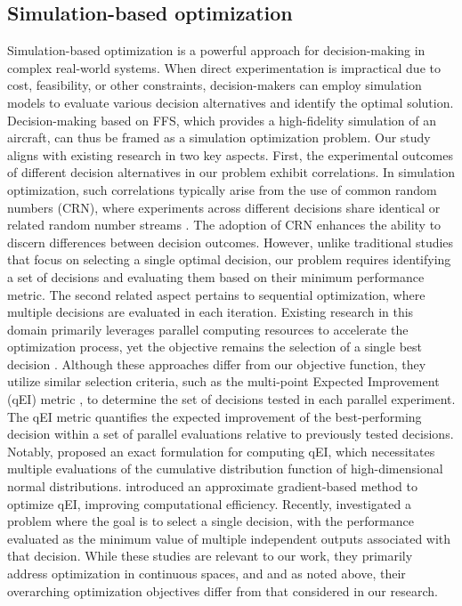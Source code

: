 \documentclass[opre,sglanonrev]{informs4}
\begin{document}
\subsection{Simulation-based optimization}
Simulation-based optimization is a powerful approach for decision-making in complex real-world systems. When direct experimentation is impractical due to cost, feasibility, or other constraints, decision-makers can employ simulation models to evaluate various decision alternatives and identify the optimal solution. Decision-making based on FFS, which provides a high-fidelity simulation of an aircraft, can thus be framed as a simulation optimization problem. Our study aligns with existing research in two key aspects. First, the experimental outcomes of different decision alternatives in our problem exhibit correlations. In simulation optimization, such correlations typically arise from the use of common random numbers (CRN), where experiments across different decisions share identical or related random number streams \citep{fu2004optimal,nelson1995using,nakayama2000multiple,kim2005comparison,xie2016bayesian}. The adoption of CRN enhances the ability to discern differences between decision outcomes. However, unlike traditional studies that focus on selecting a single optimal decision, our problem requires identifying a set of decisions and evaluating them based on their minimum performance metric. The second related aspect pertains to sequential optimization, where multiple decisions are evaluated in each iteration. Existing research in this domain primarily leverages parallel computing resources to accelerate the optimization process, yet the objective remains the selection of a single best decision \citep{wu2016parallel,daulton2021parallel}. Although these approaches differ from our objective function, they utilize similar selection criteria, such as the multi-point Expected Improvement (qEI) metric \citep{ginsbourger2008multi}, to determine the set of decisions tested in each parallel experiment. The qEI metric quantifies the expected improvement of the best-performing decision within a set of parallel evaluations relative to previously tested decisions. Notably, \cite{chevalier2013fast} proposed an exact formulation for computing qEI, which necessitates multiple evaluations of the cumulative distribution function of high-dimensional normal distributions. \cite{wang2020parallel} introduced an approximate gradient-based method to optimize qEI, improving computational efficiency. Recently, \cite{men2023simulation} investigated a problem where the goal is to select a single decision, with the performance evaluated as the minimum value of multiple independent outputs associated with that decision. While these studies are relevant to our work, they primarily address optimization in continuous spaces, and and as noted above, their overarching optimization objectives differ from that considered in our research.
\end{document}
